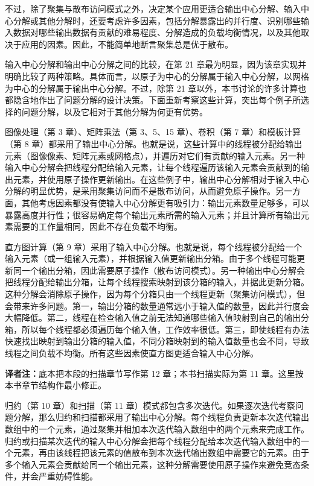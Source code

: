 不过，除了聚集与散布访问模式之外，决定某个应用更适合输出中心分解、输入中心分解或其他分解时，还要考虑许多因素，包括分解暴露出的并行度、识别哪些输入数据对哪些输出数据有贡献的难易程度、分解造成的负载均衡情况，以及其他取决于应用的因素。因此，不能简单地断言聚集总是优于散布。

输入中心分解和输出中心分解之间的比较，在第 21 章最为明显，因为该章实现并明确比较了两种策略。具体而言，以原子为中心的分解属于输入中心分解，以网格为中心的分解属于输出中心分解。不过，除第 21 章以外，本书讨论的许多计算也都隐含地作出了问题分解的设计决策。下面重新考察这些计算，突出每个例子所选择的问题分解，以及它相对于其他分解为何更有优势。

图像处理（第 3 章）、矩阵乘法（第 3、5、15 章）、卷积（第 7 章）和模板计算（第 8 章）都采用了输出中心分解。也就是说，这些计算中的线程被分配给输出元素（图像像素、矩阵元素或网格点），并遍历对它们有贡献的输入元素。另一种输入中心分解会把线程分配给输入元素，让每个线程遍历该输入元素会贡献到的输出元素，并使用原子操作更新输出。在这些例子中，输出中心分解相对于输入中心分解的明显优势，是采用聚集访问而不是散布访问，从而避免原子操作。另一方面，其他考虑因素都没有使输入中心分解更有吸引力：输出元素数量足够多，可以暴露高度并行性；很容易确定每个输出元素所需的输入元素；并且计算所有输出元素需要的工作量相同，因此不存在负载不均衡。

直方图计算（第 9 章）采用了输入中心分解。也就是说，每个线程被分配给一个输入元素（或一组输入元素），并根据输入值更新输出分箱。由于多个线程可能更新同一个输出分箱，因此需要原子操作（散布访问模式）。另一种输出中心分解会把线程分配给输出分箱，让每个线程搜索映射到该分箱的输入，并据此更新分箱。这种分解会消除原子操作，因为每个分箱只由一个线程更新（聚集访问模式），但会带来许多问题。第一，输出分箱的数量通常远小于输入值的数量，因此并行度会大幅降低。第二，线程在检查输入值之前无法知道哪些输入值映射到自己的输出分箱，所以每个线程都必须遍历每个输入值，工作效率很低。第三，即使线程有办法快速找出映射到输出分箱的输入值，不同分箱映射到的输入值数量也会不同，导致线程之间负载不均衡。所有这些因素使直方图更适合输入中心分解。

\noindent\textbf{译者注：}底本把本段的扫描章节写作第 12 章；本书扫描实际为第 11 章。这里按本书章节结构作最小修正。

归约（第 10 章）和扫描（第 11 章）模式都包含多次迭代。如果逐次迭代考察问题分解，那么归约和扫描都采用了输出中心分解。每个线程负责更新本次迭代输出数组中的一个元素，通过聚集并相加本次迭代输入数组中的两个元素来完成工作。归约或扫描某次迭代的输入中心分解会把每个线程分配给本次迭代输入数组中的一个元素，再由该线程把该元素的值散布到本次迭代输出数组中需要它的元素。由于多个输入元素会贡献给同一个输出元素，这种分解需要使用原子操作来避免竞态条件，并会严重妨碍性能。

